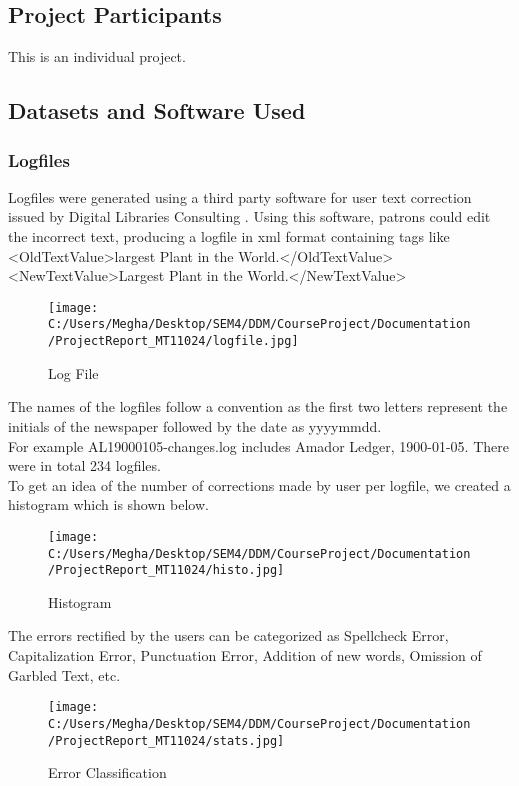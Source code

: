 \subsection{Project Participants}
This is an individual project.

\subsection{Datasets and Software Used}
\subsubsection{Logfiles}
Logfiles were generated using a third party software for user text correction issued by Digital Libraries Consulting \cite{digital}. Using this software, patrons could edit the incorrect text, producing a logfile in xml format containing tags like \\
\textless OldTextValue\textgreater largest Plant in the World.\textless/OldTextValue\textgreater \\ 
\textless NewTextValue\textgreater Largest Plant in the World.\textless/NewTextValue\textgreater \\
\begin{figure}[ht!]
\centering
\texttt{[image: C:/Users/Megha/Desktop/SEM4/DDM/CourseProject/Documentation/ProjectReport\_MT11024/logfile.jpg]}
\caption{Log File}
\label{fig:Logfile}
\end{figure}

The names of the logfiles follow a convention as the first two letters represent the initials of the newspaper followed by the date as yyyymmdd.\\ For example AL19000105-changes.log includes Amador Ledger, 1900-01-05. There were in total 234 logfiles. \\

To get an idea of the number of corrections made by user per logfile, we created a histogram which is shown below. \\
\begin{figure}[ht!]
\centering
\texttt{[image: C:/Users/Megha/Desktop/SEM4/DDM/CourseProject/Documentation/ProjectReport\_MT11024/histo.jpg]}
\caption{Histogram}
\label{fig:histogram}
\end{figure}

The errors rectified by the users can be categorized as Spellcheck Error, Capitalization Error, Punctuation Error, Addition of new words, Omission of Garbled Text, etc.\\
\begin{figure}[h]
\centering
\texttt{[image: C:/Users/Megha/Desktop/SEM4/DDM/CourseProject/Documentation/ProjectReport\_MT11024/stats.jpg]}
\caption{Error Classification}
\label{fig:Statistics}
\end{figure}


